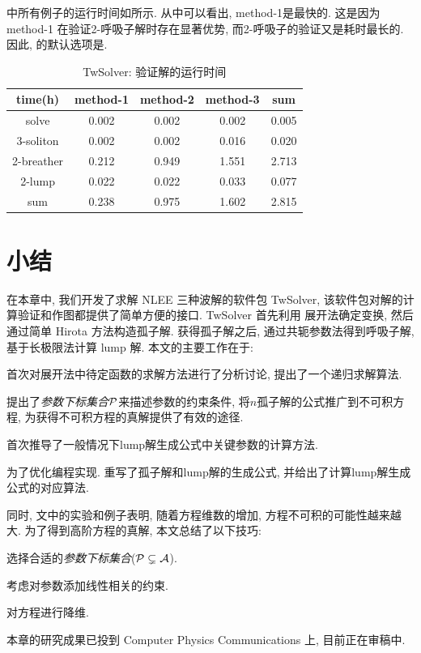 中所有例子的运行时间如所示. 从中可以看出, method-1是最快的. 这是因为 method-1 在验证2-呼吸子解时存在显著优势, 而2-呼吸子的验证又是耗时最长的. 因此, 的默认选项是. 

\begin{table}[htbp]
\centering 
\caption{TwSolver: 验证解的运行时间} \label{runtime}
\begin{tabular}{c|ccc|c}
\hline
time(h) &method-1 &method-2 &method-3 &sum\\
\hline
solve &0.002 &0.002 &0.002 &0.005\\
3-soliton &0.002 &0.002 &0.016 &0.020\\
2-breather &0.212 &0.949 &1.551 &2.713\\
2-lump &0.022 &0.022 &0.033 &0.077\\
\hline
sum &0.238 &0.975 &1.602 &2.815\\
\hline
\end{tabular}
\end{table}

\section{小结}
在本章中, 我们开发了求解 NLEE 三种波解的软件包 TwSolver, 该软件包对解的计算\D 验证和作图都提供了简单方便的接口. TwSolver 首先利用 \Painleve{}展开法确定变换, 然后通过简单 Hirota 方法构造孤子解. 获得孤子解之后, 通过共轭参数法得到呼吸子解, 基于长极限法计算 lump 解.  本文的主要工作在于: 
\begin{compactenum}[(1)]
\item 首次对\Painleve{}展开法中待定函数的求解方法进行了分析讨论, 提出了一个递归求解算法. 
\item 提出了\emph{参数下标集合}$\mathcal{P}$来描述参数的约束条件, 将$n$孤子解的公式推广到不可积方程, 为获得不可积方程的真解提供了有效的途径.
\item 首次推导了一般情况下lump解生成公式中关键参数的计算方法.
\item 为了优化编程实现. 重写了孤子解和lump解的生成公式, 并给出了计算lump解生成公式的对应算法.
\end{compactenum}

同时, 文中的实验和例子表明, 随着方程维数的增加, 方程不可积的可能性越来越大. 为了得到高阶方程的真解, 本文总结了以下技巧:
\begin{compactenum}[(1)]
\item 选择合适的\emph{参数下标集合}($\mathcal{P}\subsetneq  \mathcal{A}$). 
\item 考虑对参数添加线性相关的约束.
\item 对方程进行降维.
\end{compactenum}

本章的研究成果已投到 Computer Physics Communications 上, 目前正在审稿中. 
